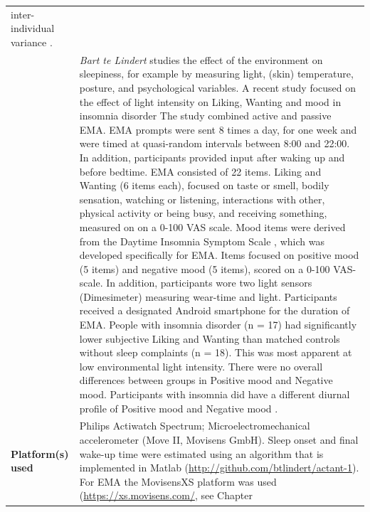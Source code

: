 \documentclass[]{book}
\begin{document}
\begin{longtable}[]{@{}ll@{}}
\begin{minipage}[t]{0.69\columnwidth}
inter-individual variance \citep{Meijden2016}.\strut
\end{minipage}\tabularnewline
\begin{minipage}[t]{0.25\columnwidth}\raggedright\strut
\strut
\end{minipage} & \begin{minipage}[t]{0.69\columnwidth}\raggedright\strut
\emph{Bart te Lindert} studies the effect of the environment on
sleepiness, for example by measuring light, (skin) temperature, posture,
and psychological variables. A recent study focused on the effect of
light intensity on Liking, Wanting and mood in insomnia disorder
\citep{Lindert2018} The study combined active and passive EMA. EMA
prompts were sent 8 times a day, for one week and were timed at
quasi-random intervals between 8:00 and 22:00. In addition, participants
provided input after waking up and before bedtime. EMA consisted of 22
items. Liking and Wanting (6 items each), focused on taste or smell,
bodily sensation, watching or listening, interactions with other,
physical activity or being busy, and receiving something, measured on on
a 0-100 VAS scale. Mood items were derived from the Daytime Insomnia
Symptom Scale \citep[DISS;][]{buysse2007}, which was developed
specifically for EMA. Items focused on positive mood (5 items) and
negative mood (5 items), scored on a 0-100 VAS-scale. In addition,
participants wore two light sensors (Dimesimeter) measuring wear-time
and light. Participants received a designated Android smartphone for the
duration of EMA. People with insomnia disorder (n = 17) had
significantly lower subjective Liking and Wanting than matched controls
without sleep complaints (n = 18). This was most apparent at low
environmental light intensity. There were no overall differences between
groups in Positive mood and Negative mood. Participants with insomnia
did have a different diurnal profile of Positive mood and Negative mood
\citep{Lindert2018}.\strut
\end{minipage}\tabularnewline
\begin{minipage}[t]{0.25\columnwidth}\raggedright\strut
\textbf{Platform(s) used}\strut
\end{minipage} & \begin{minipage}[t]{0.69\columnwidth}\raggedright\strut
Philips Actiwatch Spectrum; Microelectromechanical accelerometer (Move
II, Movisens GmbH). Sleep onset and final wake-up time were estimated
using an algorithm that is implemented in Matlab
(\url{http://github.com/btlindert/actant-1}). For EMA the MovisensXS
platform was used (\url{https://xs.movisens.com/}, see Chapter

\end{minipage}
\end{longtable}
\end{document}
